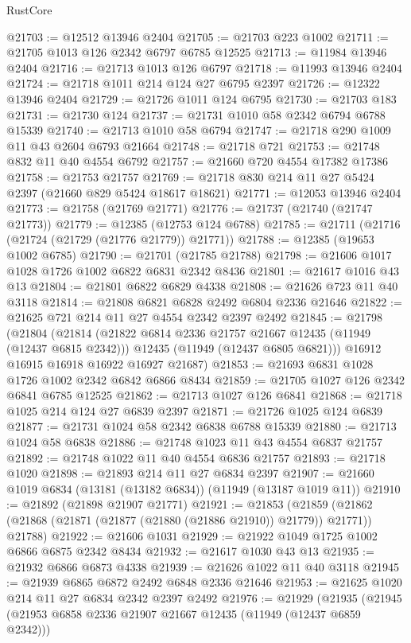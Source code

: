 \begin{lexlean}{RustCore}
\begin{coremodule}
@21703 := @12512 @13946 @2404
@21705 := @21703 @223 @1002
@21711 := @21705 @1013 @126 @2342 @6797 @6785 @12525
@21713 := @11984 @13946 @2404
@21716 := @21713 @1013 @126 @6797
@21718 := @11993 @13946 @2404
@21724 := @21718 @1011 @214 @124 @27 @6795 @2397
@21726 := @12322 @13946 @2404
@21729 := @21726 @1011 @124 @6795
@21730 := @21703 @183
@21731 := @21730 @124
@21737 := @21731 @1010 @58 @2342 @6794 @6788 @15339
@21740 := @21713 @1010 @58 @6794
@21747 := @21718 @290 @1009 @11 @43 @2604 @6793 @21664
@21748 := @21718 @721
@21753 := @21748 @832 @11 @40 @4554 @6792
@21757 := @21660 @720 @4554 @17382 @17386
@21758 := @21753 @21757
@21769 := @21718 @830 @214 @11 @27 @5424 @2397 (@21660 @829 @5424 @18617 @18621)
@21771 := @12053 @13946 @2404
@21773 := @21758 (@21769 @21771)
@21776 := @21737 (@21740 (@21747 @21773))
@21779 := @12385 (@12753 @124 @6788)
@21785 := @21711 (@21716 (@21724 (@21729 (@21776 @21779)) @21771))
@21788 := @12385 (@19653 @1002 @6785)
@21790 := @21701 (@21785 @21788)
@21798 := @21606 @1017 @1028 @1726 @1002 @6822 @6831 @2342 @8436
@21801 := @21617 @1016 @43 @13
@21804 := @21801 @6822 @6829 @4338
@21808 := @21626 @723 @11 @40 @3118
@21814 := @21808 @6821 @6828 @2492 @6804 @2336 @21646
@21822 := @21625 @721 @214 @11 @27 @4554 @2342 @2397 @2492
@21845 := @21798
    (@21804
      (@21814
        (@21822 @6814 @2336 @21757 @21667 @12435 (@11949 (@12437 @6815 @2342)))
        @12435
        (@11949 (@12437 @6805 @6821)))
      @16912
      @16915
      @16918
      @16922
      @16927
      @21687)
@21853 := @21693 @6831 @1028 @1726 @1002 @2342 @6842 @6866 @8434
@21859 := @21705 @1027 @126 @2342 @6841 @6785 @12525
@21862 := @21713 @1027 @126 @6841
@21868 := @21718 @1025 @214 @124 @27 @6839 @2397
@21871 := @21726 @1025 @124 @6839
@21877 := @21731 @1024 @58 @2342 @6838 @6788 @15339
@21880 := @21713 @1024 @58 @6838
@21886 := @21748 @1023 @11 @43 @4554 @6837 @21757
@21892 := @21748 @1022 @11 @40 @4554 @6836 @21757
@21893 := @21718 @1020
@21898 := @21893 @214 @11 @27 @6834 @2397
@21907 := @21660 @1019 @6834 (@13181 (@13182 @6834)) (@11949 (@13187 @1019 @11))
@21910 := @21892 (@21898 @21907 @21771)
@21921 := @21853
    (@21859 (@21862 (@21868 (@21871 (@21877 (@21880 (@21886 @21910)) @21779)) @21771)) @21788)
@21922 := @21606 @1031
@21929 := @21922 @1049 @1725 @1002 @6866 @6875 @2342 @8434
@21932 := @21617 @1030 @43 @13
@21935 := @21932 @6866 @6873 @4338
@21939 := @21626 @1022 @11 @40 @3118
@21945 := @21939 @6865 @6872 @2492 @6848 @2336 @21646
@21953 := @21625 @1020 @214 @11 @27 @6834 @2342 @2397 @2492
@21976 := @21929
    (@21935
      (@21945
        (@21953 @6858 @2336 @21907 @21667 @12435 (@11949 (@12437 @6859 @2342)))

\end{coremodule}
\end{lexlean}
